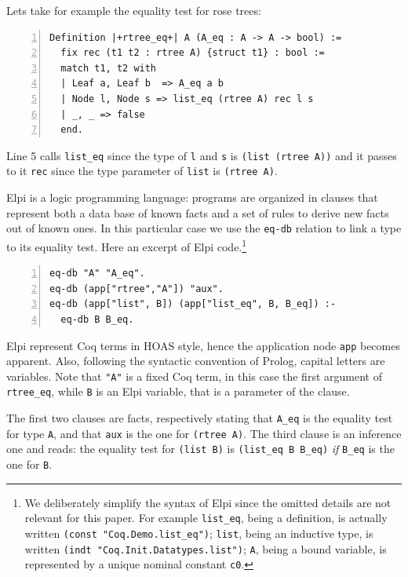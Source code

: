 \documentclass[sigplan,10pt,review]{acmart}\settopmatter{printfolios=true,printccs=false,printacmref=false}
\begin{document}
Lets take for example the equality test for rose trees:

\begin{minipage}{\textwidth}\begin{lstlisting}[numbers=left]
Definition |+rtree_eq+| A (A_eq : A -> A -> bool) :=
  fix rec (t1 t2 : rtree A) {struct t1} : bool :=
  match t1, t2 with
  | Leaf a, Leaf b  => A_eq a b
  | Node l, Node s => list_eq (rtree A) rec l s
  | _, _ => false
  end.
\end{lstlisting}\end{minipage}

\noindent
Line 5 calls \lstinline+list_eq+ since the type of \lstinline+l+ and
\lstinline+s+ is \lstinline+(list (rtree A))+ and it passes to it
\lstinline+rec+ since the type parameter of \lstinline+list+ is
\lstinline+(rtree A)+.

Elpi is a logic programming language: programs are organized in
clauses that represent both a data base of known facts
and a set of rules to derive new facts out of known ones.
In this particular case we use the \lstinline+eq-db+ relation
to link a type to its equality test. Here an excerpt of Elpi
code.\footnote{We deliberately simplify the syntax of Elpi 
since the omitted details are not relevant for this paper.
For example \lstinline+list_eq+, being a definition,
is actually written \lstinline+(const "Coq.Demo.list_eq")+; 
\lstinline+list+, being an inductive type,
is written \lstinline+(indt "Coq.Init.Datatypes.list")+;
\lstinline+A+, being a bound variable, is represented by
a unique nominal constant \lstinline+c0+.}

\begin{minipage}{\textwidth}\begin{lstlisting}[numbers=left]
eq-db "A" "A_eq".
eq-db (app["rtree","A"]) "aux".
eq-db (app["list", B]) (app["list_eq", B, B_eq]) :-
  eq-db B B_eq.
\end{lstlisting}\end{minipage}

\noindent
Elpi represent Coq terms in HOAS style,
hence the application node \lstinline+app+ becomes apparent.
Also, following the syntactic
convention of Prolog, capital letters are variables.
Note that \lstinline+"A"+ is a fixed Coq term,
in this case the first argument of \lstinline+rtree_eq+, while
\lstinline+B+ is an Elpi variable, that is a parameter
of the clause.

The first two clauses are facts, respectively stating that
\lstinline+A_eq+ is the equality test for type
\lstinline+A+, and that \lstinline+aux+ is the one for
\lstinline+(rtree A)+. 
The third clause is an inference one and reads: the equality test
for \lstinline+(list B)+ is \lstinline+(list_eq B B_eq)+ \emph{if}
\lstinline+B_eq+ is the one for \lstinline+B+.
\end{document}
